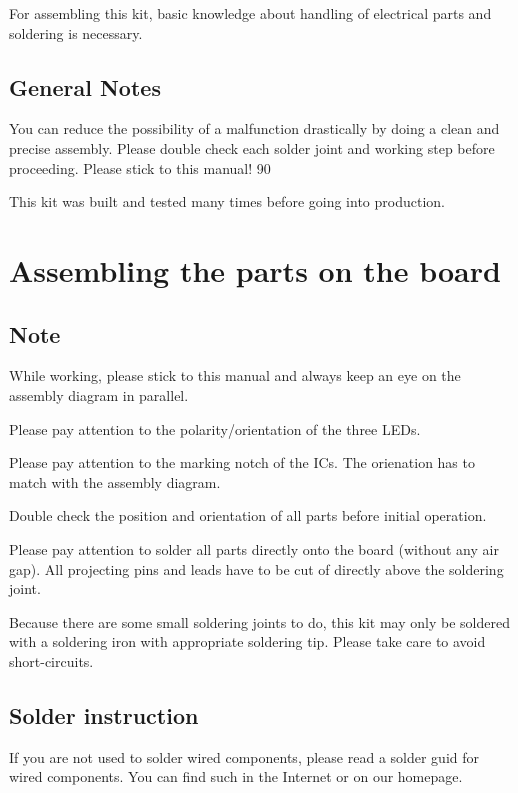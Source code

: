 \documentclass[fleqn,10pt]{SelfArx} %
\begin{document}
For assembling this kit, basic knowledge about handling of electrical parts and soldering is necessary.

 \subsection*{General Notes}

You can reduce the possibility of a malfunction drastically by doing a clean and precise assembly. Please double check each solder joint and working step before proceeding. Please stick to this manual!
90%

This kit was built and tested many times before going into production.


\section{Assembling the parts on the board}

 \subsection*{Note}

While working, please stick to this manual and always keep an eye on the assembly diagram in parallel.

Please pay attention to the polarity/orientation of the three LEDs.

Please pay attention to the marking notch of the ICs. The orienation has to match with the assembly diagram.

Double check the position and orientation of all parts before initial operation.

Please pay attention to solder all parts directly onto the board (without any air gap). All projecting pins and leads have to be cut of directly above the soldering joint.

Because there are some small soldering joints to do, this kit may only be soldered with a soldering iron with appropriate soldering tip. Please take care to avoid short-circuits.

 \subsection*{Solder instruction}

If you are not used to solder wired components, please read a solder guid for wired components. You can find such in the Internet or on our homepage.
\end{document}
